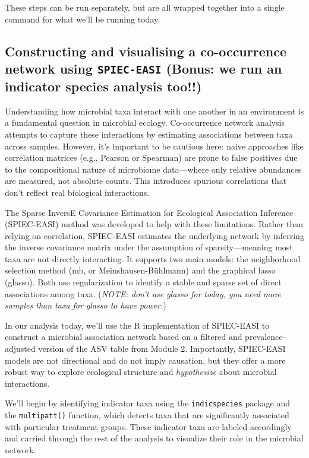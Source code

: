 \documentclass[
]{book}
\begin{document}
These steps can be run separately, but are all wrapped together into a single command for what we'll be running today.

\subsection{\texorpdfstring{Constructing and visualising a co-occurrence network using \texttt{SPIEC-EASI} (Bonus: we run an indicator species analysis too!!)}{Constructing and visualising a co-occurrence network using SPIEC-EASI (Bonus: we run an indicator species analysis too!!)}}\label{constructing-and-visualising-a-co-occurrence-network-using-spiec-easi-bonus-we-run-an-indicator-species-analysis-too}

Understanding how microbial taxa interact with one another in an environment is a fundamental question in microbial ecology. Co-occurrence network analysis attempts to capture these interactions by estimating associations between taxa across samples. However, it's important to be cautious here: naive approaches like correlation matrices (e.g., Pearson or Spearman) are prone to false positives due to the compositional nature of microbiome data---where only relative abundances are measured, not absolute counts. This introduces spurious correlations that don't reflect real biological interactions.

The Sparse InversE Covariance Estimation for Ecological Association Inference (SPIEC-EASI) method was developed to help with these limitations. Rather than relying on correlation, SPIEC-EASI estimates the underlying network by inferring the inverse covariance matrix under the assumption of sparsity---meaning most taxa are not directly interacting. It supports two main models: the neighborhood selection method (mb, or Meinshausen-Bühlmann) and the graphical lasso (glasso). Both use regularization to identify a stable and sparse set of direct associations among taxa. (\emph{NOTE: don't use glasso for today, you need more samples than taxa for glasso to have power.})

In our analysis today, we'll use the R implementation of SPIEC-EASI to construct a microbial association network based on a filtered and prevalence-adjusted version of the ASV table from Module 2. Importantly, SPIEC-EASI models are not directional and do not imply causation, but they offer a more robust way to explore ecological structure and \emph{hypothesize} about microbial interactions.

We'll begin by identifying indicator taxa using the \texttt{indicspecies} package and the \texttt{multipatt()} function, which detects taxa that are significantly associated with particular treatment groups. These indicator taxa are labeled accordingly and carried through the rest of the analysis to visualize their role in the microbial network.
\end{document}
